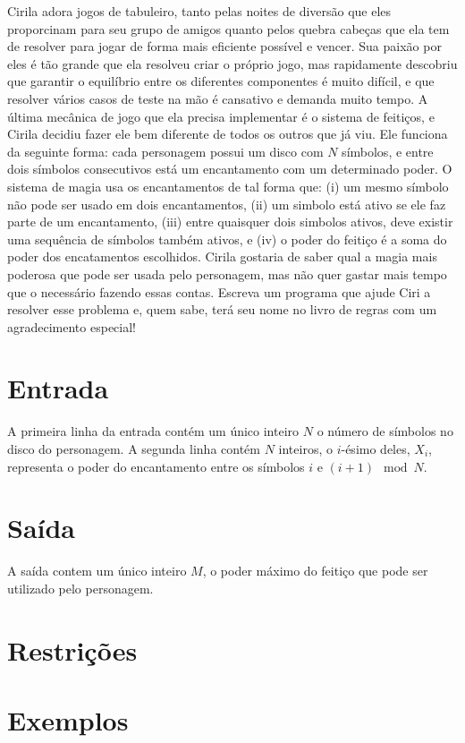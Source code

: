 Cirila adora jogos de tabuleiro, tanto pelas noites de diversão que eles proporcinam para seu grupo de amigos quanto pelos quebra cabeças que ela tem de resolver para jogar de forma mais eficiente possível e vencer.
Sua paixão por eles é tão grande que ela resolveu criar o próprio jogo, mas rapidamente descobriu que garantir o equilíbrio entre os diferentes componentes é muito difícil, e que resolver vários casos de teste na mão é cansativo e demanda muito tempo.
A última mecânica de jogo que ela precisa implementar é o sistema de feitiços, e Cirila decidiu fazer ele bem diferente de todos os outros que já viu.
Ele funciona da seguinte forma: cada personagem possui um disco com $N$ símbolos, e entre dois símbolos consecutivos está um encantamento com um determinado poder.
O sistema de magia usa os encantamentos de tal forma que: (i) um mesmo símbolo não pode ser usado em dois encantamentos, (ii) um simbolo está ativo se ele faz parte de um encantamento, (iii) entre quaisquer dois simbolos ativos, deve existir uma sequência de símbolos também ativos, e (iv) o poder do feitiço é a soma do poder dos encatamentos escolhidos.
Cirila gostaria de saber qual a magia mais poderosa que pode ser usada pelo personagem, mas não quer gastar mais tempo que o necessário fazendo essas contas.
Escreva um programa que ajude Ciri a resolver esse problema e, quem sabe, terá seu nome no livro de regras com um agradecimento especial!
\section*{Entrada}

A primeira linha da entrada contém um único inteiro $N$ o número de símbolos no disco do personagem.
A segunda linha contém $N$ inteiros, o $i$-ésimo deles, $X_i$, representa o poder do encantamento entre os símbolos $i$ e $(i+1) \mod N$.

\section*{Saída}

A saída contem um único inteiro $M$, o poder máximo do feitiço que pode ser utilizado pelo personagem.

\section*{Restrições}



\section*{Exemplos}

\exemplo
